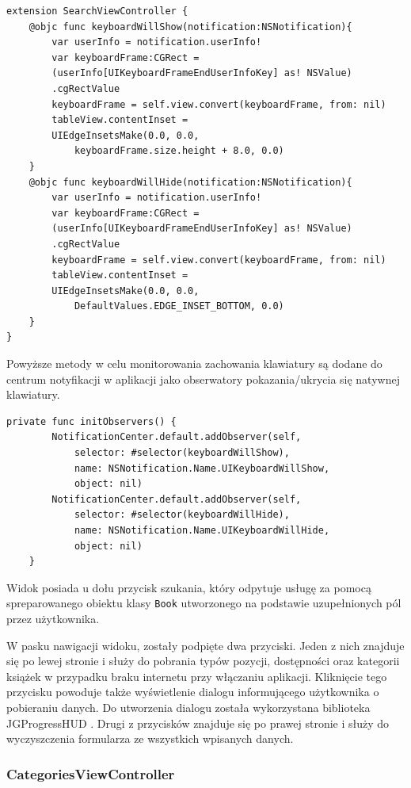 \documentclass[twoside]{projektInzynierskiMS}
\begin{document}
\begin{verbatim}
extension SearchViewController {
    @objc func keyboardWillShow(notification:NSNotification){
        var userInfo = notification.userInfo!
        var keyboardFrame:CGRect =
        (userInfo[UIKeyboardFrameEndUserInfoKey] as! NSValue)
        .cgRectValue
        keyboardFrame = self.view.convert(keyboardFrame, from: nil)
        tableView.contentInset =
        UIEdgeInsetsMake(0.0, 0.0,
            keyboardFrame.size.height + 8.0, 0.0)
    }
    @objc func keyboardWillHide(notification:NSNotification){
        var userInfo = notification.userInfo!
        var keyboardFrame:CGRect =
        (userInfo[UIKeyboardFrameEndUserInfoKey] as! NSValue)
        .cgRectValue
        keyboardFrame = self.view.convert(keyboardFrame, from: nil)
        tableView.contentInset =
        UIEdgeInsetsMake(0.0, 0.0,
            DefaultValues.EDGE_INSET_BOTTOM, 0.0)
    }
}
\end{verbatim}

Powyższe metody w celu monitorowania zachowania klawiatury są dodane do centrum notyfikacji w aplikacji jako obserwatory pokazania/ukrycia się natywnej klawiatury.

\begin{verbatim}
private func initObservers() {
        NotificationCenter.default.addObserver(self,
            selector: #selector(keyboardWillShow),
            name: NSNotification.Name.UIKeyboardWillShow,
            object: nil)
        NotificationCenter.default.addObserver(self,
            selector: #selector(keyboardWillHide),
            name: NSNotification.Name.UIKeyboardWillHide,
            object: nil)
    }
\end{verbatim}

Widok posiada u dołu przycisk szukania, który odpytuje usługę za pomocą spreparowanego obiektu klasy \verb`Book` utworzonego na podstawie uzupełnionych pól przez użytkownika.

W pasku nawigacji widoku, zostały podpięte dwa przyciski. Jeden z nich znajduje się po lewej stronie i służy do pobrania typów pozycji, dostępności oraz kategorii książek w przypadku braku internetu przy włączaniu aplikacji. Kliknięcie tego przycisku powoduje także wyświetlenie dialogu informującego użytkownika o pobieraniu danych. Do utworzenia dialogu została wykorzystana biblioteka JGProgressHUD \cite{JGProgressHUD}. Drugi z przycisków znajduje się po prawej stronie i służy do wyczyszczenia formularza ze wszystkich wpisanych danych.


\subsubsection{CategoriesViewController}
\end{document}
